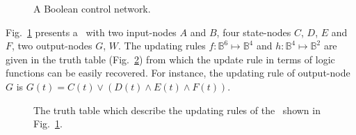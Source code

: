 \begin{example}
\begin{figure}[thpb]
		\caption{A Boolean control network. }%
		\label{fig:1}
	\end{figure}
%	
Fig.~\ref{fig:1} presents a \BCN\ with two input-nodes $A$ and $B$, four state-nodes $C$, $D$, $E$ and $F$, two output-nodes $G$, $W$. 
The updating rules $f:\mathbb{B}^{6}\mapsto \mathbb{B}^4$ and $h:\mathbb{B}^4\mapsto \mathbb{B}^2$ are given in the truth table (Fig.~\ref{fig:2}) from which the update rule in terms of logic functions can be easily recovered.   For instance, %
the updating rule of output-node $G$ is 
$G(t)=C(t)\vee {({D}(t)\wedge { E}(t)\wedge {F}(t))}.$
 \begin{figure}[thpb]
	\centering
	\caption{The truth table which describe the updating rules of the \BCN\ shown in Fig.~\ref{fig:1}.}
	\label{fig:2}
\end{figure}
\end{example}   

